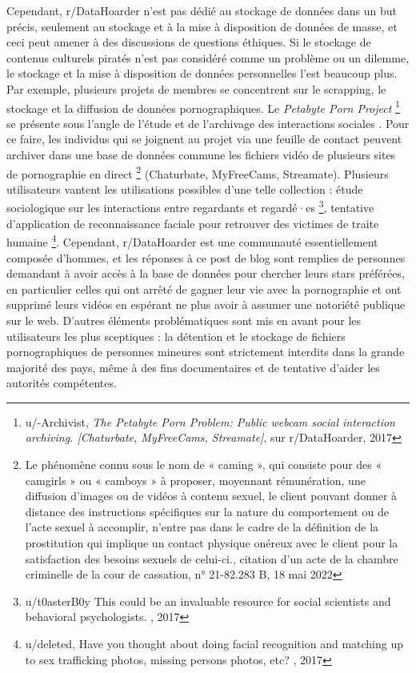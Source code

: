 Cependant, r/DataHoarder n'est pas dédié au stockage de données dans un but précis, seulement au stockage et à la mise à disposition de données de masse, et ceci peut amener à des discussions de questions éthiques. Si le stockage de contenus culturels piratés n'est pas considéré comme un problème ou un dilemme, le stockage et la mise à disposition de données personnelles l'est beaucoup plus. Par exemple, plusieurs projets de membres se concentrent sur le scrapping, le stockage et la diffusion de données pornographiques. Le \textit{Petabyte Porn Project} \footnote{u/-Archivist, \textit{The Petabyte Porn Problem: Public webcam social interaction archiving. [Chaturbate, MyFreeCams, Streamate]}, sur r/DataHoarder, 2017} se présente sous l'angle de l'étude et de l'archivage des \og interactions sociales \fg. Pour ce faire, les individus qui se joignent au projet via une feuille de contact peuvent archiver dans une base de données commune les fichiers vidéo de plusieurs sites de pornographie en direct \footnote{\og Le phénomène connu sous le nom de « caming », qui consiste pour des « camgirls » ou « camboys » à proposer, moyennant rémunération, une diffusion d'images ou de vidéos à contenu sexuel, le client pouvant donner à distance des instructions spécifiques sur la nature du comportement ou de l'acte sexuel à accomplir, n'entre pas dans le cadre de la définition de la prostitution qui implique un contact physique onéreux avec le client pour la satisfaction des besoins sexuels de celui-ci.\fg, citation d'un acte de la chambre criminelle de la cour de cassation, n° 21-82.283 B, 18 mai 2022} (Chaturbate, MyFreeCams, Streamate). Plusieurs utilisateurs vantent les utilisations possibles d'une telle collection : étude sociologique sur les interactions entre regardants et regardé·es \footnote{u/t0asterB0y \og This could be an invaluable resource for social scientists and behavioral psychologists. \fg, 2017}, tentative d'application de reconnaissance faciale pour retrouver des victimes de traite humaine \footnote{u/deleted,  \og Have you thought about doing facial recognition and matching up to sex trafficking photos, missing persons photos, etc? \fg, 2017}. Cependant, r/DataHoarder est une communauté essentiellement composée d'hommes, et les réponses à ce post de blog sont remplies de personnes demandant à avoir accès à la base de données pour chercher leurs stars préférées, en particulier celles qui ont arrêté de gagner leur vie avec la pornographie et ont supprimé leurs vidéos en espérant ne plus avoir à assumer une notoriété publique sur le web. D'autres éléments problématiques sont mis en avant pour les utilisateurs les plus sceptiques : la détention et le stockage de fichiers pornographiques de personnes mineures sont strictement interdits dans la grande majorité des pays, même à des fins documentaires et de tentative d'aider les autorités compétentes. 

